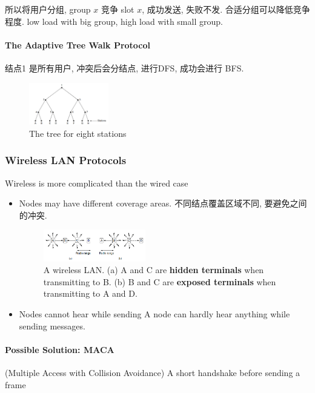 所以将用户分组, group $x$ 竞争 slot $x$, 成功发送, 失败不发. 合适分组可以降低竞争程度. low load with big group, high load with small group. 


\paragraph{The Adaptive Tree Walk Protocol}结点1 是所有用户, 冲突后会分结点, 进行DFS, 成功会进行 BFS. 
\begin{figure}[!htb]
    \centering
    \includegraphics[width=0.309\textwidth]{pic/CN4/The tree for eight stations}
    \caption{The tree for eight stations}
\end{figure}


\subsubsection{Wireless LAN Protocols}
Wireless is more complicated than the wired case
\begin{itemize}
    \item Nodes may have different coverage areas. 
    \subitem 不同结点覆盖区域不同, 要避免之间的冲突. 
    \begin{figure}[!htb]
        \centering
        \includegraphics[width=0.42\textwidth]{pic/CN4/A wireless LAN.}
        \caption{A wireless LAN. (a) A and C are \textbf{hidden terminals} when transmitting to B. (b) B and C are \textbf{exposed terminals} when transmitting to A and D.}
    \end{figure}
    \item Nodes cannot hear while sending
    \subitem A node can hardly hear anything while sending messages. 
\end{itemize}

\paragraph{Possible Solution: MACA} (Multiple Access with Collision Avoidance) A short handshake before sending a frame

